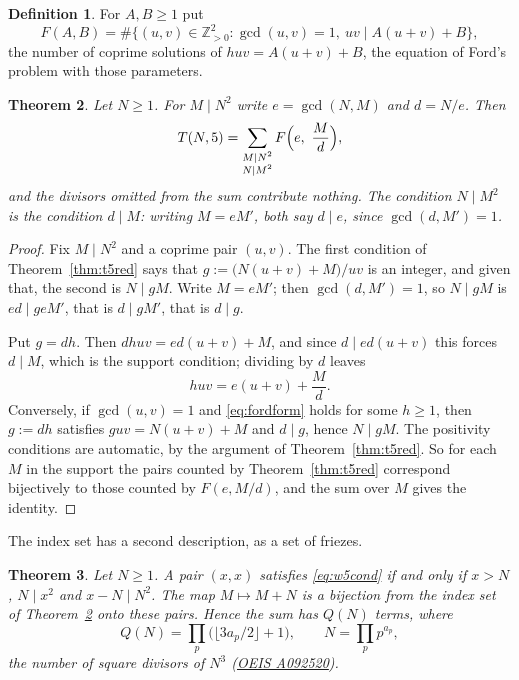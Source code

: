 \documentclass[11pt]{article}
\theoremstyle{plain}
\newtheorem{theorem}{Theorem}[section]
\theoremstyle{definition}
\newtheorem{definition}[theorem]{Definition}
\newcommand{\Z}{\mathbb{Z}}
\begin{document}
\begin{definition}\label{def:ford}
For $A,B\ge1$ put
\[
  F(A,B)=\#\bigl\{(u,v)\in\Z_{>0}^2 : \gcd(u,v)=1,\ uv\mid A(u+v)+B\bigr\},
\]
the number of coprime solutions of $huv=A(u+v)+B$, the equation of Ford's problem with
those parameters.
\end{definition}

\begin{theorem}\label{thm:fordsum}
Let $N\ge1$. For $M\mid N^2$ write $e=\gcd(N,M)$ and $d=N/e$. Then
\[
  T(N,5)=\sum_{\substack{M\mid N^{2}\\ N\mid M^{2}}} F\Bigl(e,\ \frac{M}{d}\Bigr),
\]
and the divisors omitted from the sum contribute nothing. The condition $N\mid M^2$ is the
condition $d\mid M$: writing $M=eM'$, both say $d\mid e$, since $\gcd(d,M')=1$.
\end{theorem}

\begin{proof}
Fix $M\mid N^2$ and a coprime pair $(u,v)$. The first condition of Theorem~\ref{thm:t5red}
says that $g:=\bigl(N(u+v)+M\bigr)/uv$ is an integer, and given that, the second is
$N\mid gM$. Write $M=eM'$; then $\gcd(d,M')=1$, so $N\mid gM$ is $ed\mid geM'$, that is
$d\mid gM'$, that is $d\mid g$.

Put $g=dh$. Then $dhuv=ed(u+v)+M$, and since $d\mid ed(u+v)$ this forces $d\mid M$, which
is the support condition; dividing by $d$ leaves
\begin{equation}\label{eq:fordform}
  huv=e(u+v)+\frac{M}{d}.
\end{equation}
Conversely, if $\gcd(u,v)=1$ and \eqref{eq:fordform} holds for some $h\ge1$, then $g:=dh$
satisfies $guv=N(u+v)+M$ and $d\mid g$, hence $N\mid gM$. The positivity conditions are
automatic, by the argument of Theorem~\ref{thm:t5red}. So for each $M$ in the support the
pairs counted by Theorem~\ref{thm:t5red} correspond bijectively to those counted by
$F(e,M/d)$, and the sum over $M$ gives the identity.
\end{proof}

The index set has a second description, as a set of friezes.

\begin{theorem}\label{thm:diag}
Let $N\ge1$. A pair $(x,x)$ satisfies \eqref{eq:w5cond} if and only if $x>N$, $N\mid x^2$
and $x-N\mid N^2$. The map $M\mapsto M+N$ is a bijection from the index set of
Theorem~\ref{thm:fordsum} onto these pairs. Hence the sum has $Q(N)$ terms, where
\[
  Q(N)=\prod_p\bigl(\lfloor 3a_p/2\rfloor+1\bigr),\qquad N=\prod_p p^{a_p},
\]
the number of square divisors of $N^3$ (\href{https://oeis.org/A092520}{OEIS A092520}).
\end{theorem}
\end{document}
